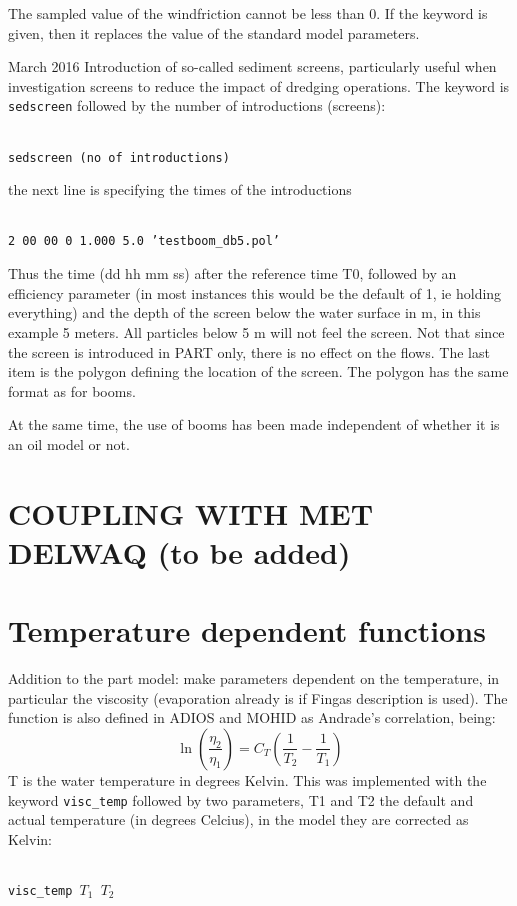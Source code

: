 \documentclass[english]{deltares_manual}
\newcommand\tab[1][1cm]{\hspace*{#1}}
\begin{document}
The sampled value of the windfriction cannot be less than 0. If the keyword is given, then it replaces the value of the standard model parameters.

March 2016
Introduction of so-called sediment screens, particularly useful when investigation screens to reduce the impact of dredging operations. The keyword is \texttt{sedscreen} followed by the number of introductions (screens):
\begin{tcolorbox}
	\footnotesize
	\texttt{\\
	sedscreen (no of introductions)
}
\end{tcolorbox}

the next line is specifying the times of the introductions

\begin{tcolorbox}
	\footnotesize
	\texttt{\\
2  00 00  0   \tab      1.000 \tab    5.0  \tab     'testboom\_db5.pol' \\
}
\end{tcolorbox}

Thus the time (dd hh mm ss) after the reference time T0, followed by an efficiency parameter (in most instances this would be the default of 1, ie holding everything) and the depth of the screen below the water surface in m, in this example 5 meters. All particles below 5 m will not feel the screen. Not that since the screen is introduced in PART only, there is no effect on the flows. The last item is the polygon defining the location of the screen. The polygon has the same format as for booms.

At the same time, the use of booms has been made independent of whether it is an oil model or not. 

\section{COUPLING WITH MET DELWAQ (to be added)}

\section{Temperature dependent functions}
Addition to the part model: make parameters dependent on the temperature, in particular the viscosity (evaporation already is if Fingas description is used). The function is also defined in ADIOS and MOHID as Andrade’s correlation, being:
\begin{equation}\label{eq:viscocity_temp}
\ln \left(\frac{\eta_2}{\eta_1} \right) = C_T \left(\frac{1}{T_2}-\frac{1}{T_1} \right)
\end{equation}
T is the water temperature in degrees Kelvin.  This was implemented with the keyword 
\texttt{visc\_temp} followed by two parameters, T1 and T2 the default and actual temperature (in degrees Celcius), in the model they are corrected as Kelvin:
\begin{tcolorbox}
	\footnotesize
	\texttt{\\
		visc\_temp \tab  $T_1$  $T_2$
	}
\end{tcolorbox}
\end{document}
